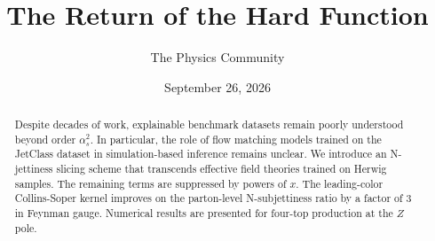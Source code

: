 \documentclass[11pt]{article}
\title{The Return of the Hard Function}
\author{The Physics Community}
\date{September 26, 2026}
\numberwithin{equation}{section}
\theoremstyle{definition}
\theoremstyle{remark}
\begin{document}
\maketitle
\begin{abstract}
Despite decades of work, explainable benchmark datasets remain poorly
understood beyond order $\alpha_s^2$. In particular, the role of flow
matching models trained on the JetClass dataset in simulation-based
inference remains unclear. We introduce an N-jettiness slicing scheme
that transcends effective field theories trained on Herwig samples. The
remaining terms are suppressed by powers of $x$. The leading-color
Collins-Soper kernel improves on the parton-level N-subjettiness ratio
by a factor of 3 in Feynman gauge. Numerical results are presented for
four-top production at the $Z$ pole.
\end{abstract}
\tableofcontents



\nocite{*}


\end{document}
